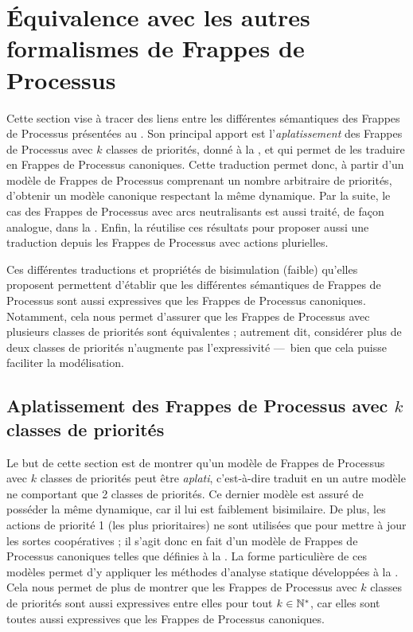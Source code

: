 \section{Équivalence avec les autres formalismes de Frappes de Processus}

Cette section vise à tracer des liens entre les différentes sémantiques des Frappes de Processus
présentées au .
Son principal apport est l'\emph{aplatissement} des Frappes de Processus avec $k$
classes de priorités, donné à la ,
et qui permet de les traduire en Frappes de Processus canoniques.
Cette traduction permet donc, à partir d'un modèle de Frappes de Processus comprenant un nombre
arbitraire de priorités, d'obtenir un modèle canonique respectant la même dynamique.
Par la suite, le cas des Frappes de Processus avec arcs neutralisants est aussi traité,
de façon analogue, dans la .
Enfin, la  réutilise ces résultats pour proposer aussi une traduction
depuis les Frappes de Processus avec actions plurielles.

Ces différentes traductions et propriétés de bisimulation (faible) qu'elles proposent
permettent d'établir que les différentes sémantiques de Frappes de Processus sont
aussi expressives que les Frappes de Processus canoniques.
Notamment, cela nous permet d'assurer que les Frappes de Processus avec plusieurs
classes de priorités sont équivalentes ;
autrement dit, considérer plus de deux classes de priorités n'augmente pas l'expressivité
---~bien que cela puisse faciliter la modélisation.



\subsection{Aplatissement des Frappes de Processus avec $k$ classes de priorités}

Le but de cette section est de montrer qu'un modèle de Frappes de Processus avec $k$ classes
de priorités peut être \emph{aplati}, c'est-à-dire traduit en un autre modèle ne comportant
que 2 classes de priorités.
Ce dernier modèle est assuré de posséder la même dynamique,
car il lui est faiblement bisimilaire.
De plus, les actions de priorité 1 (les plus prioritaires) ne sont utilisées que pour mettre
à jour les sortes coopératives ;
il s'agit donc en fait d'un modèle de Frappes de Processus canoniques telles que définies
à la .
La forme particulière de ces modèles permet d'y appliquer les méthodes d'analyse statique
développées à la .
Cela nous permet de plus de montrer que les Frappes de Processus avec $k$ classes de priorités
sont aussi expressives entre elles pour tout $k \in \mathbb{N}^*$,
car elles sont toutes aussi expressives que les Frappes de Processus canoniques.

